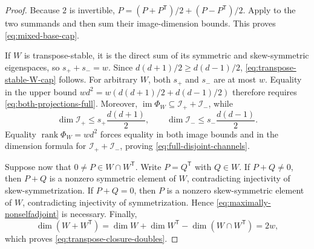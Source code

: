\documentclass[11pt]{article}
\newcommand{\rank}{\operatorname{rank}}
\newcommand{\transpose}{\mathsf T}
\begin{document}
\begin{proof}
Because $2$ is invertible,
$P=(P+P^\transpose)/2+(P-P^\transpose)/2$.  Apply
 to the two summands and then
sum their image-dimension bounds.  This proves
\eqref{eq:mixed-base-cap}.

If $W$ is transpose-stable, it is the direct sum of its symmetric and
skew-symmetric eigenspaces, so $s_++s_-=w$.  Since
$d(d+1)/2\ge d(d-1)/2$, \eqref{eq:transpose-stable-W-cap} follows.
For arbitrary $W$, both $s_+$ and $s_-$ are at most $w$.  Equality in the
upper bound $wd^2=w(d(d+1)/2+d(d-1)/2)$ therefore requires
\eqref{eq:both-projections-full}.  Moreover,
$\operatorname{im}\Phi_W\subseteq\mathcal I_++\mathcal I_-$, while
\[
 \dim\mathcal I_+\le s_+\frac{d(d+1)}2,
 \qquad
 \dim\mathcal I_-\le s_-\frac{d(d-1)}2.
\]
Equality $\rank\Phi_W=wd^2$ forces equality in both image bounds and in
the dimension formula for $\mathcal I_++\mathcal I_-$, proving
\eqref{eq:full-disjoint-channels}.

Suppose now that $0\ne P\in W\cap W^\transpose$.  Write $P=Q^\transpose$
with $Q\in W$.  If $P+Q\ne0$, then $P+Q$ is a nonzero symmetric element of
$W$, contradicting injectivity of skew-symmetrization.  If $P+Q=0$, then
$P$ is a nonzero skew-symmetric element of $W$, contradicting injectivity of
symmetrization.  Hence \eqref{eq:maximally-nonselfadjoint} is necessary.  Finally,
\[
 \dim(W+W^\transpose)
   =\dim W+\dim W^\transpose-\dim(W\cap W^\transpose)=2w,
\]
which proves \eqref{eq:transpose-closure-doubles}.
\end{proof}
\end{document}
